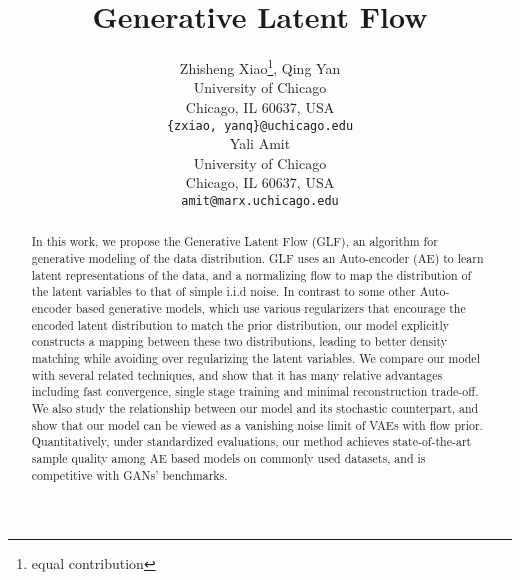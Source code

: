 \documentclass{article}
\begin{document}
\title{Generative Latent Flow}

\author{Zhisheng Xiao\thanks{equal contribution}, Qing Yan \footnotemark[1]\\
University of Chicago\\
Chicago, IL 60637, USA \\
\texttt{\{zxiao, yanq\}@uchicago.edu} \\
\And
Yali Amit \\
University of Chicago\\
Chicago, IL 60637, USA \\
\texttt{amit@marx.uchicago.edu} \\
}

\maketitle



\begin{abstract}
  In this work, we propose the Generative Latent Flow (GLF), an algorithm for generative modeling of the data distribution. GLF uses an Auto-encoder (AE) to learn latent representations of the data, and a normalizing flow to map the distribution of the latent variables to that of simple i.i.d noise. In contrast to some other Auto-encoder based generative models, which use various regularizers that encourage the encoded latent distribution to match the prior distribution, our model explicitly constructs a mapping between these two distributions, leading to better density matching while avoiding over regularizing the latent variables. We compare our model with several related techniques, and show that it has many relative advantages including fast convergence, single stage training and minimal reconstruction trade-off. We also study the relationship between our model and its stochastic counterpart, and show that our model can be viewed as a vanishing noise limit of VAEs with flow prior.  Quantitatively, under standardized evaluations, our method achieves state-of-the-art sample quality among AE based models on commonly used datasets, and is competitive with GANs' benchmarks. 
\end{abstract}
\end{document}
